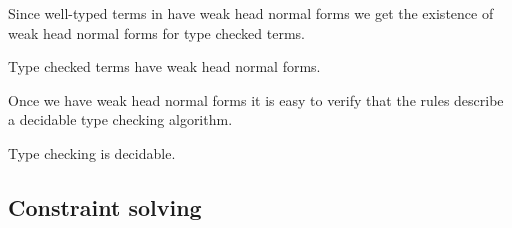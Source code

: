 
Since well-typed terms in {\Core} have weak head normal forms we get the
existence of weak head normal forms for type checked terms.

\begin{corollary}
    Type checked terms have weak head normal forms.
\end{corollary}

Once we have weak head normal forms it is easy to verify that the rules
describe a decidable type checking algorithm.

\begin{corollary}
    Type checking is decidable.
\end{corollary}

\subsection{Constraint solving}



